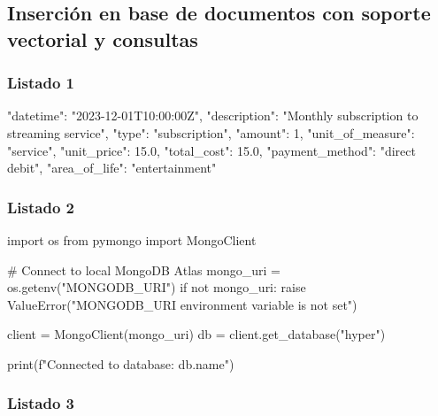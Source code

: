 \subsection{Inserción en base de documentos con soporte vectorial y consultas}

\subsubsection{Listado 1}
\label{anexo:code-4-4-2-1}

\begin{APACode}
{
    "datetime": "2023-12-01T10:00:00Z",
    "description": "Monthly subscription to streaming service", 
    "type": "subscription",
    "amount": 1, 
    "unit_of_measure": "service", 
    "unit_price": 15.0,
    "total_cost": 15.0, 
    "payment_method": "direct debit", 
    "area_of_life": "entertainment"
}
\end{APACode}

\subsubsection{Listado 2}
\label{anexo:code-4-4-2-2}

\begin{APACode}
import os
from pymongo import MongoClient

# Connect to local MongoDB Atlas 
mongo_uri = os.getenv("MONGODB_URI") 
if not mongo_uri:
    raise ValueError("MONGODB_URI environment variable is not set")

client = MongoClient(mongo_uri) 
db = client.get_database("hyper")

print(f"Connected to database: {db.name}")
\end{APACode}

\subsubsection{Listado 3}
\label{anexo:code-4-4-2-3}

